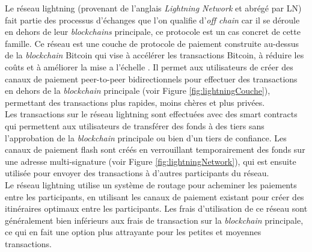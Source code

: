 Le réseau lightning (provenant de l'anglais \textit{Lightning Network} et abrégé par LN) fait partie des processus d'échanges que l'on qualifie d'\textit{\gls{off chain}} car il se déroule en dehors de leur \textit{\gls{blockchain}s} principale, ce protocole est un cas concret de cette famille.
Ce réseau est une couche de protocole de paiement construite au-dessus de la \textit{\gls{blockchain}} \gls{Bitcoin} qui vise à accélérer les transactions  \gls{Bitcoin}, à réduire les coûts et à améliorer la mise a l'échelle \cite{poon2016bitcoin}.
Il permet aux utilisateurs de créer des canaux de paiement peer-to-peer bidirectionnels  pour effectuer des transactions en dehors de la \textit{\gls{blockchain}} principale (voir Figure \ref{fig:lightningCouche}), permettant des transactions plus rapides, moins chères et plus privées.\\
Les transactions sur le réseau lightning sont effectuées avec des \gls{smart contract}s qui permettent aux utilisateurs de transférer des fonds à des tiers sans l'approbation de la \textit{\gls{blockchain}} principale ou bien d'un tiers de confiance. 
Les canaux de paiement flash sont créés en verrouillant temporairement des fonds sur une adresse multi-signature (voir Figure \ref{fig:lightningNetwork}), qui est ensuite utilisée pour envoyer des transactions à d'autres participants du réseau.\\ 
Le réseau lightning utilise un système de routage pour acheminer les paiements entre les participants, en utilisant les canaux de paiement existant pour créer des itinéraires optimaux entre les participants. 
Les frais d'utilisation de ce réseau sont généralement bien inférieurs aux frais de transaction sur la \textit{\gls{blockchain}} principale, ce qui en fait une option plus attrayante pour les  petites et moyennes transactions.

